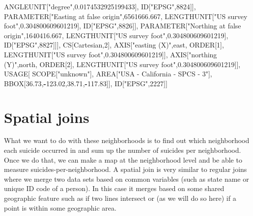 \documentclass[
  12pt,
]{book}
\newenvironment{Shaded}{\begin{snugshade}}{\end{snugshade}}
\newcommand{\DecValTok}[1]{\textcolor[rgb]{0.06,0.06,0.06}{#1}}
\newcommand{\FloatTok}[1]{\textcolor[rgb]{0.06,0.06,0.06}{#1}}
\newcommand{\NormalTok}[1]{#1}
\newcommand{\OperatorTok}[1]{\textcolor[rgb]{0.43,0.43,0.43}{\textbf{#1}}}
\newcommand{\StringTok}[1]{\textcolor[rgb]{0.5,0.5,0.5}{#1}}
\begin{document}
\begin{Shaded}
\begin{Highlighting}[]
\NormalTok{            ANGLEUNIT[}\StringTok{"degree"}\NormalTok{,}\FloatTok{0.0174532925199433}\NormalTok{],}
\NormalTok{            ID[}\StringTok{"EPSG"}\NormalTok{,}\DecValTok{8824}\NormalTok{]],}
\NormalTok{        PARAMETER[}\StringTok{"Easting at false origin"}\NormalTok{,}\FloatTok{6561666.667}\NormalTok{,}
\NormalTok{            LENGTHUNIT[}\StringTok{"US survey foot"}\NormalTok{,}\FloatTok{0.304800609601219}\NormalTok{],}
\NormalTok{            ID[}\StringTok{"EPSG"}\NormalTok{,}\DecValTok{8826}\NormalTok{]],}
\NormalTok{        PARAMETER[}\StringTok{"Northing at false origin"}\NormalTok{,}\FloatTok{1640416.667}\NormalTok{,}
\NormalTok{            LENGTHUNIT[}\StringTok{"US survey foot"}\NormalTok{,}\FloatTok{0.304800609601219}\NormalTok{],}
\NormalTok{            ID[}\StringTok{"EPSG"}\NormalTok{,}\DecValTok{8827}\NormalTok{]]],}
\NormalTok{    CS[Cartesian,}\DecValTok{2}\NormalTok{],}
\NormalTok{        AXIS[}\StringTok{"easting (X)"}\NormalTok{,east,}
\NormalTok{            ORDER[}\DecValTok{1}\NormalTok{],}
\NormalTok{            LENGTHUNIT[}\StringTok{"US survey foot"}\NormalTok{,}\FloatTok{0.304800609601219}\NormalTok{]],}
\NormalTok{        AXIS[}\StringTok{"northing (Y)"}\NormalTok{,north,}
\NormalTok{            ORDER[}\DecValTok{2}\NormalTok{],}
\NormalTok{            LENGTHUNIT[}\StringTok{"US survey foot"}\NormalTok{,}\FloatTok{0.304800609601219}\NormalTok{]],}
\NormalTok{    USAGE[}
\NormalTok{        SCOPE[}\StringTok{"unknown"}\NormalTok{],}
\NormalTok{        AREA[}\StringTok{"USA {-} California {-} SPCS {-} 3"}\NormalTok{],}
\NormalTok{        BBOX[}\FloatTok{36.73}\NormalTok{,}\OperatorTok{{-}}\FloatTok{123.02}\NormalTok{,}\FloatTok{38.71}\NormalTok{,}\OperatorTok{{-}}\FloatTok{117.83}\NormalTok{]],}
\NormalTok{    ID[}\StringTok{"EPSG"}\NormalTok{,}\DecValTok{2227}\NormalTok{]]}
\end{Highlighting}
\end{Shaded}

\hypertarget{spatial-joins}{%
\section{Spatial joins}\label{spatial-joins}}

What we want to do with these neighborhoods is to find out which neighborhood each suicide occurred in and sum up the number of suicides per neighborhood. Once we do that, we can make a map at the neighborhood level and be able to measure suicides-per-neighborhood. A spatial join is very similar to regular joins where we merge two data sets based on common variables (such as state name or unique ID code of a person). In this case it merges based on some shared geographic feature such as if two lines intersect or (as we will do so here) if a point is within some geographic area.
\end{document}

